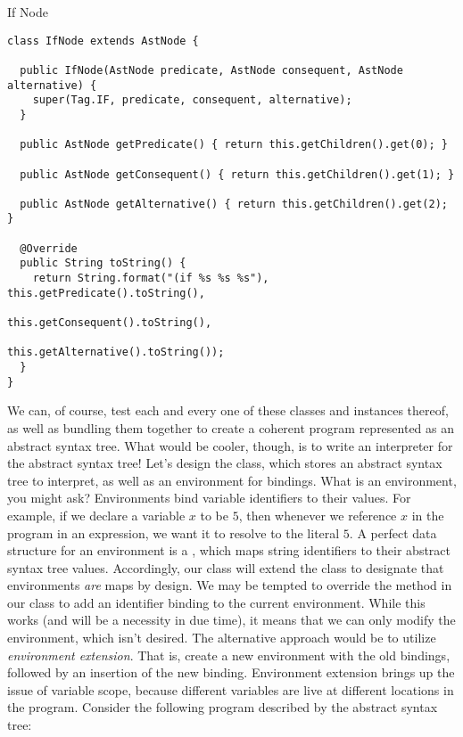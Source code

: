 \begin{cl}{If Node}
\begin{lstlisting}[language=MyJava]
class IfNode extends AstNode {
  
  public IfNode(AstNode predicate, AstNode consequent, AstNode alternative) {
    super(Tag.IF, predicate, consequent, alternative);
  }
  
  public AstNode getPredicate() { return this.getChildren().get(0); }
  
  public AstNode getConsequent() { return this.getChildren().get(1); }
  
  public AstNode getAlternative() { return this.getChildren().get(2); }
  
  @Override
  public String toString() {
    return String.format("(if %s %s %s"), this.getPredicate().toString(),
                                          this.getConsequent().toString(),
                                          this.getAlternative().toString());
  }
}
\end{lstlisting}
\end{cl}

We can, of course, test each and every one of these classes and instances thereof, as well as bundling them together to create a coherent program represented as an abstract syntax tree. What would be cooler, though, is to write an interpreter for the abstract syntax tree! Let's design the  class, which stores an abstract syntax tree to interpret, as well as an environment for bindings. What is an environment, you might ask? Environments bind variable identifiers to their values. For example, if we declare a variable $x$ to be $5$, then whenever we reference $x$ in the program in an expression, we want it to resolve to the literal $5$. A perfect data structure for an environment is a , which maps string identifiers to their abstract syntax tree values. Accordingly, our  class will extend the  class to designate that environments \textit{are} maps by design. We may be tempted to override the  method in our  class to add an identifier binding to the current environment. While this works (and will be a necessity in due time), it means that we can only modify the environment, which isn't desired. The alternative approach would be to utilize \textit{environment extension}. That is, create a new environment with the old bindings, followed by an insertion of the new binding. Environment extension brings up the issue of variable scope, because different variables are live at different locations in the program. Consider the following program described by the abstract syntax tree:

